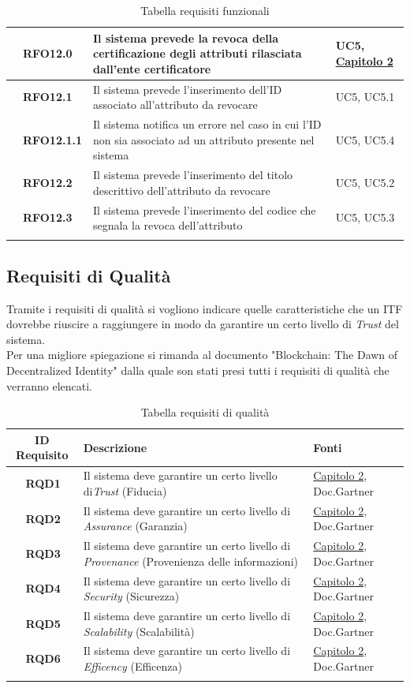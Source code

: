 \begin{longtable}{|r l|p{10cm}|p{2cm}|}
	&\textbf{RFO12.0}&Il sistema prevede la revoca della certificazione degli attributi rilasciata dall'ente certificatore&UC5, \hyperref[cap:tecnologie_e_strumenti]{Capitolo 2} \\\hline
	&\textbf{RFO12.1}&Il sistema prevede l'inserimento dell'ID associato all'attributo da revocare&UC5, UC5.1 \\\hline
	&\textbf{RFO12.1.1}&Il sistema notifica un errore nel caso in cui l'ID non sia associato ad un attributo presente nel sistema&UC5, UC5.4 \\\hline
	&\textbf{RFO12.2}&Il sistema prevede l'inserimento del titolo descrittivo dell'attributo da revocare&UC5, UC5.2 \\\hline
	&\textbf{RFO12.3}&Il sistema prevede l'inserimento del codice che segnala la revoca dell'attributo&UC5, UC5.3 \\\hline
	\caption{Tabella requisiti funzionali}
\end{longtable}
\subsection{Requisiti di Qualità}
Tramite i requisiti di qualità si vogliono indicare quelle caratteristiche che un \gls{ITF} dovrebbe riuscire a raggiungere in modo da garantire un certo livello di \textit{Trust} del sistema.\\
Per una migliore spiegazione si rimanda al documento "Blockchain: The Dawn of Decentralized Identity" \cite{ITF_gartner} dalla quale son stati presi tutti i requisiti di qualità che verranno elencati.
\begin{longtable}{|r l|p{10cm}|p{2.5cm}|}
	\hline
	\multicolumn{2}{|c|}{\textbf{ID Requisito}} & \textbf{Descrizione} & \textbf{Fonti}\tabularnewline
	\hline
	&\textbf{RQD1}&Il sistema deve garantire un certo livello di\textit{Trust} (Fiducia)& \hyperref[cap:tecnologie_e_strumenti]{Capitolo 2}, Doc.Gartner \cite{ITF_gartner}\\\hline
	&\textbf{RQD2}&Il sistema deve garantire un certo livello di \textit{Assurance} (Garanzia)& \hyperref[cap:tecnologie_e_strumenti]{Capitolo 2}, Doc.Gartner \cite{ITF_gartner}\\\hline
	&\textbf{RQD3}&Il sistema deve garantire un certo livello di \textit{Provenance} (Provenienza delle informazioni)& \hyperref[cap:tecnologie_e_strumenti]{Capitolo 2}, Doc.Gartner \cite{ITF_gartner}\\\hline
	&\textbf{RQD4}&Il sistema deve garantire un certo livello di \textit{Security} (Sicurezza)& \hyperref[cap:tecnologie_e_strumenti]{Capitolo 2}, Doc.Gartner \cite{ITF_gartner}\\\hline
	&\textbf{RQD5}&Il sistema deve garantire un certo livello di \textit{Scalability} (Scalabilità)& \hyperref[cap:tecnologie_e_strumenti]{Capitolo 2}, Doc.Gartner \cite{ITF_gartner}\\\hline
	&\textbf{RQD6}&Il sistema deve garantire un certo livello di \textit{Efficency} (Efficenza)& \hyperref[cap:tecnologie_e_strumenti]{Capitolo 2}, Doc.Gartner \cite{ITF_gartner}\\\hline
	\caption{Tabella requisiti di qualità}
\end{longtable}
